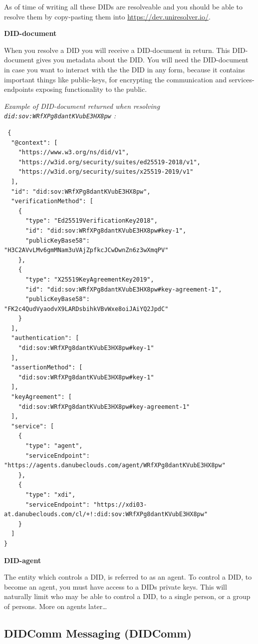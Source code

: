 As of time of writing all these DIDs are resolveable and you should be
able to resolve them by copy-pasting them into
\url{https://dev.uniresolver.io/}.

\textbf{DID-document}

When you resolve a DID you will receive a DID-document in return. This
DID-document gives you metadata about the DID. You will need the
DID-document in case you want to interact with the the DID in any form,
because it contains important things like public-keys, for encrypting
the communication and services-endpoints exposing functionality to the
public.

\emph{Example of DID-document returned when resolving
\passthrough{\lstinline!did:sov:WRfXPg8dantKVubE3HX8pw!} :}

\begin{lstlisting}
 {
  "@context": [
    "https://www.w3.org/ns/did/v1",
    "https://w3id.org/security/suites/ed25519-2018/v1",
    "https://w3id.org/security/suites/x25519-2019/v1"
  ],
  "id": "did:sov:WRfXPg8dantKVubE3HX8pw",
  "verificationMethod": [
    {
      "type": "Ed25519VerificationKey2018",
      "id": "did:sov:WRfXPg8dantKVubE3HX8pw#key-1",
      "publicKeyBase58": "H3C2AVvLMv6gmMNam3uVAjZpfkcJCwDwnZn6z3wXmqPV"
    },
    {
      "type": "X25519KeyAgreementKey2019",
      "id": "did:sov:WRfXPg8dantKVubE3HX8pw#key-agreement-1",
      "publicKeyBase58": "FK2c4QudVyaodvX9LARDsbihkVBvWxe8oiJAiYQ2JpdC"
    }
  ],
  "authentication": [
    "did:sov:WRfXPg8dantKVubE3HX8pw#key-1"
  ],
  "assertionMethod": [
    "did:sov:WRfXPg8dantKVubE3HX8pw#key-1"
  ],
  "keyAgreement": [
    "did:sov:WRfXPg8dantKVubE3HX8pw#key-agreement-1"
  ],
  "service": [
    {
      "type": "agent",
      "serviceEndpoint": "https://agents.danubeclouds.com/agent/WRfXPg8dantKVubE3HX8pw"
    },
    {
      "type": "xdi",
      "serviceEndpoint": "https://xdi03-at.danubeclouds.com/cl/+!:did:sov:WRfXPg8dantKVubE3HX8pw"
    }
  ]
}
\end{lstlisting}

\textbf{DID-agent}

The entity which controls a DID, is referred to as an agent. To control
a DID, to become an agent, you must have access to a DIDs private keys.
This will naturally limit who may be able to control a DID, to a single
person, or a group of persons. More on agents later\ldots{}

\hypertarget{didcomm-messaging-didcomm}{%
\subsection{DIDComm Messaging
(DIDComm)}\label{didcomm-messaging-didcomm}}

